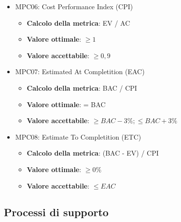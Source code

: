 \documentclass[12pt]{article}
\begin{document}
\begin{itemize}
	\item MPC06: Cost Performance Index (CPI)
			\begin{itemize}
				\item \textbf{Calcolo della metrica}:  EV / AC
				\item \textbf{Valore ottimale}: $\ge 1$
				\item \textbf{Valore accettabile}: $\ge 0,9$
			\end{itemize}
	
	\item MPC07: Estimated At Completition (EAC)
	      \begin{itemize}
		      \item \textbf{Calcolo della metrica}:  BAC / CPI
		      \item \textbf{Valore ottimale}: = BAC
		      \item \textbf{Valore accettabile}: $\ge BAC - 3\% ; \le BAC + 3\% $
	      \end{itemize}
	\item MPC08: Estimate To Completition (ETC)
	      \begin{itemize}
		      \item \textbf{Calcolo della metrica}:  (BAC - EV) / CPI
		      \item \textbf{Valore ottimale}: $\ge 0\%$
		      \item \textbf{Valore accettabile}: $\le EAC$
	      \end{itemize}
\end{itemize}

\subsection{Processi di supporto}
\end{document}
